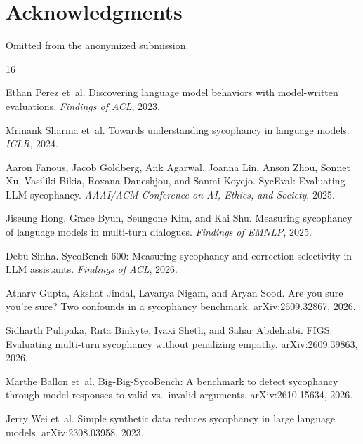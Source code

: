 \documentclass{article}
\begin{document}
\section*{Acknowledgments}

Omitted from the anonymized submission.

{\small
\begin{thebibliography}{16}

Ethan Perez et~al.
\newblock Discovering language model behaviors with model-written evaluations.
\newblock \emph{Findings of ACL}, 2023.

Mrinank Sharma et~al.
\newblock Towards understanding sycophancy in language models.
\newblock \emph{ICLR}, 2024.

Aaron Fanous, Jacob Goldberg, Ank Agarwal, Joanna Lin, Anson Zhou,
Sonnet Xu, Vasiliki Bikia, Roxana Daneshjou, and Sanmi Koyejo.
\newblock SycEval: Evaluating LLM sycophancy.
\newblock \emph{AAAI/ACM Conference on AI, Ethics, and Society}, 2025.

Jiseung Hong, Grace Byun, Seungone Kim, and Kai Shu.
\newblock Measuring sycophancy of language models in multi-turn dialogues.
\newblock \emph{Findings of EMNLP}, 2025.

Debu Sinha.
\newblock SycoBench-600: Measuring sycophancy and correction selectivity in
  LLM assistants.
\newblock \emph{Findings of ACL}, 2026.

Atharv Gupta, Akshat Jindal, Lavanya Nigam, and Aryan Sood.
\newblock Are you sure you're sure? Two confounds in a sycophancy benchmark.
\newblock arXiv:2609.32867, 2026.

Sidharth Pulipaka, Ruta Binkyte, Ivaxi Sheth, and Sahar Abdelnabi.
\newblock FIGS: Evaluating multi-turn sycophancy without penalizing empathy.
\newblock arXiv:2609.39863, 2026.

Marthe Ballon et~al.
\newblock Big-Big-SycoBench: A benchmark to detect sycophancy through model
  responses to valid vs.\ invalid arguments.
\newblock arXiv:2610.15634, 2026.

Jerry Wei et~al.
\newblock Simple synthetic data reduces sycophancy in large language models.
\newblock arXiv:2308.03958, 2023.


\end{thebibliography}}
\end{document}
